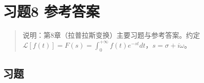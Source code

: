 \chapter{习题8 参考答案}\label{ux4e60ux98988-ux53c2ux8003ux7b54ux6848}

\begin{quote}
说明：第8章（拉普拉斯变换）主要习题与参考答案。约定
\(\mathcal L[f(t)]=F(s)=\int_0^{+\infty}f(t)e^{-st}dt\)，\(s=\sigma+i\omega\)。
\end{quote}

\section{习题}\label{ux4e60ux9898-7}

